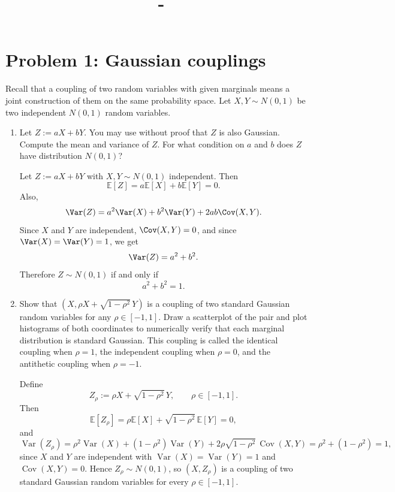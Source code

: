 \documentclass[answers,12pt,addpoints]{exam}
\author{\name}
\title{\course\ - \assignment}
\newcommand{\EE}{\mathbb{E}}
\begin{document}
\maketitle

\section*{Problem 1: Gaussian couplings}

Recall that a coupling of two random variables with given marginals means a joint construction of them on the same probability space. Let $X, Y \sim N(0,1)$ be two independent $N(0,1)$ random variables.

\begin{enumerate}
  \item Let $Z := aX + bY$. You may use without proof that $Z$ is also Gaussian. Compute the mean and variance of $Z$. For what condition on $a$ and $b$ does $Z$ have distribution $N(0,1)$?

  \begin{solution}
  Let $Z := aX + bY$ with $X,Y \sim N(0,1)$ independent. Then
  \[
  \EE[Z] = a\EE[X] + b\EE[Y] = 0.
  \]
  Also,
  \[
  \Var(Z) = a^2\Var(X) + b^2\Var(Y) + 2ab\Cov(X,Y).
  \]
  Since $X$ and $Y$ are independent, $\Cov(X,Y)=0$, and since $\Var(X)=\Var(Y)=1$, we get
  \[
  \Var(Z) = a^2 + b^2.
  \]
  Therefore $Z \sim N(0,1)$ if and only if
  \[
  a^2 + b^2 = 1.
  \]
  \end{solution}

  \item Show that $(X,\rho X + \sqrt{1-\rho^2}\,Y)$ is a coupling of two standard Gaussian random variables for any $\rho \in [-1,1]$. Draw a scatterplot of the pair and plot histograms of both coordinates to numerically verify that each marginal distribution is standard Gaussian. This coupling is called the identical coupling when $\rho = 1$, the independent coupling when $\rho = 0$, and the antithetic coupling when $\rho = -1$.

  \begin{solution}
Define
\[
  Z_\rho := \rho X + \sqrt{1-\rho^2}\,Y, \qquad \rho \in [-1,1].
\]
Then
\[
  \mathbb{E}[Z_\rho]
  = \rho \mathbb{E}[X] + \sqrt{1-\rho^2}\,\mathbb{E}[Y]
  = 0,
\]
and
\[
  \operatorname{Var}(Z_\rho)
  = \rho^2 \operatorname{Var}(X)
    + (1-\rho^2)\operatorname{Var}(Y)
    + 2\rho\sqrt{1-\rho^2}\,\operatorname{Cov}(X,Y)
  = \rho^2 + (1-\rho^2) = 1,
\]
since $X$ and $Y$ are independent with
$\operatorname{Var}(X)=\operatorname{Var}(Y)=1$ and
$\operatorname{Cov}(X,Y)=0$.
Hence $Z_\rho \sim N(0,1)$, so $(X,Z_\rho)$ is a coupling of two
standard Gaussian random variables for every $\rho \in [-1,1]$.


\end{solution}
\end{enumerate}
\end{document}
